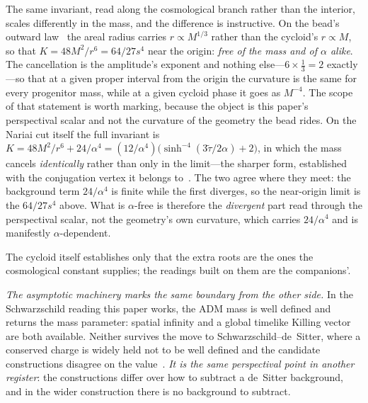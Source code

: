 \documentclass[11pt,a4paper]{article}
\theoremstyle{definition}
\begin{document}
The same invariant, read along the cosmological branch rather than the interior, scales differently in the
mass, and the difference is instructive. On the bead's outward law~\cite{JanzenCRframework} the areal radius
carries $r\propto M^{1/3}$ rather than the cycloid's $r\propto M$, so that
$K=48M^{2}/r^{6}=64/27s^{4}$ near the origin: \emph{free of the mass and of $\alpha$ alike}. The cancellation is
the amplitude's exponent and nothing else---$6\times\tfrac13=2$ exactly---so that at a given proper interval
from the origin the curvature is the same for every progenitor mass, while at a given cycloid phase it goes as
$M^{-4}$. 
The scope of that statement is worth marking, because the object is this paper's perspectival scalar and not
the curvature of the geometry the bead rides. On the Nariai cut itself the full invariant is
$K=48M^{2}/r^{6}+24/\alpha^{4}=(12/\alpha^{4})\bigl(\sinh^{-4}(3\tilde\tau/2\alpha)+2\bigr)$, in which the mass
cancels \emph{identically} rather than only in the limit---the sharper form, established with the conjugation
vertex it belongs to~\cite{JanzenBoundary}. The two agree where they meet: the background term $24/\alpha^{4}$
is finite while the first diverges, so the near-origin limit is the $64/27s^{4}$ above. What is $\alpha$-free is
therefore the \emph{divergent} part read through the perspectival scalar, not the geometry's own curvature,
which carries $24/\alpha^{4}$ and is manifestly $\alpha$-dependent.

The cycloid itself establishes only that the extra roots are the ones the cosmological constant supplies; the readings built on them are the companions'.

\emph{The asymptotic machinery marks the same boundary from the other side.} In the Schwarzschild reading this paper works, the ADM mass is well defined and returns the mass parameter: spatial infinity and a global timelike Killing vector are both available. Neither survives the move to Schwarzschild--de~Sitter, where a conserved charge is widely held not to be well defined and the candidate constructions disagree on the value~\cite{JanzenSlicing}. \emph{It is the same perspectival point in another register}: the constructions differ over how to subtract a de~Sitter background, and in the wider construction there is no background to subtract.
\end{document}
